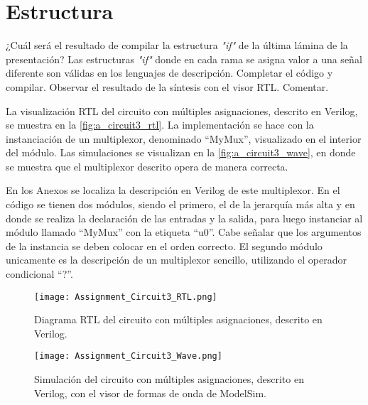 \section{Estructura \label{sec:s2}}

\begin{center}
	\begin{minipage}{12cm}
		\begin{tcolorbox}[title=Actividad 3]
			¿Cuál será el resultado de compilar la estructura \textit{"if"} de la última lámina de la presentación? Las estructuras \textit{"if"} donde en cada rama se asigna valor a una señal diferente son válidas en los lenguajes de descripción. Completar el código y compilar. Observar el resultado de la síntesis con el visor RTL. Comentar.
		\end{tcolorbox}	
	\end{minipage}
\end{center}

La visualización RTL del circuito con múltiples asignaciones, descrito en Verilog, se muestra en la \autoref{fig:a_circuit3_rtl}. La implementación se hace con la instanciación de un multiplexor, denominado ``MyMux'', visualizado en el interior del módulo. Las simulaciones se visualizan en la \autoref{fig:a_circuit3_wave}, en donde se muestra que el multiplexor descrito opera de manera correcta.

En los Anexos se localiza la descripción en Verilog de este multiplexor. En el código se tienen dos módulos, siendo el primero, el de la jerarquía más alta y en donde se realiza la declaración de las entradas y la salida, para luego instanciar al módulo llamado ``MyMux'' con la etiqueta ``u0''. Cabe señalar que los argumentos de la instancia se deben colocar en el orden correcto. El segundo módulo unicamente es la descripción de un multiplexor sencillo, utilizando el operador condicional ``?''.

\begin{figure}[ht]
	\centering
	\texttt{[image: Assignment\_Circuit3\_RTL.png]}
	\caption{Diagrama RTL del circuito con múltiples asignaciones, descrito en Verilog. \label{fig:a_circuit3_rtl}}
\end{figure}

\begin{figure}[ht]
	\centering
	\texttt{[image: Assignment\_Circuit3\_Wave.png]}
	\caption{Simulación del circuito con múltiples asignaciones, descrito en Verilog, con el visor de formas de onda de ModelSim. \label{fig:a_circuit3_wave}}
\end{figure}